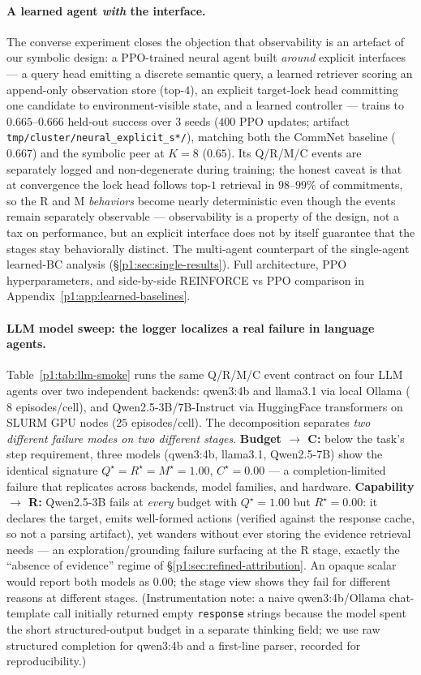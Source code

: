 \documentclass{article}
\begin{document}
\paragraph{A learned agent \emph{with} the interface.} The converse experiment closes the objection that observability is an artefact of our symbolic design: a PPO-trained neural agent built \emph{around} explicit interfaces --- a query head emitting a discrete semantic query, a learned retriever scoring an append-only observation store (top-$4$), an explicit target-lock head committing one candidate to environment-visible state, and a learned controller --- trains to $0.665$--$0.666$ held-out success over $3$ seeds ($400$ PPO updates; artifact \texttt{tmp/cluster/neural\_explicit\_s*/}), matching both the CommNet baseline ($0.667$) and the symbolic peer at $K{=}8$ ($0.65$). Its Q/R/M/C events are separately logged and non-degenerate during training; the honest caveat is that at convergence the lock head follows top-$1$ retrieval in $98$--$99\%$ of commitments, so the R and M \emph{behaviors} become nearly deterministic even though the events remain separately observable --- observability is a property of the design, not a tax on performance, but an explicit interface does not by itself guarantee that the stages stay behaviorally distinct. The multi-agent counterpart of the single-agent learned-BC analysis (\S\ref{p1:sec:single-results}). Full architecture, PPO hyperparameters, and side-by-side REINFORCE vs PPO comparison in Appendix~\ref{p1:app:learned-baselines}.

\paragraph{LLM model sweep: the logger localizes a real failure in language agents.}
Table~\ref{p1:tab:llm-smoke} runs the same Q/R/M/C event contract on four LLM agents over two independent backends: qwen3:4b and llama3.1 via local Ollama ($8$ episodes/cell), and Qwen2.5-3B/7B-Instruct via HuggingFace transformers on SLURM GPU nodes ($25$ episodes/cell). The decomposition separates \emph{two different failure modes on two different stages}. \textbf{Budget $\to$ C:} below the task's step requirement, three models (qwen3:4b, llama3.1, Qwen2.5-7B) show the identical signature $Q^\star{=}R^\star{=}M^\star{=}1.00$, $C^\star{=}0.00$ --- a completion-limited failure that replicates across backends, model families, and hardware. \textbf{Capability $\to$ R:} Qwen2.5-3B fails at \emph{every} budget with $Q^\star{=}1.00$ but $R^\star{=}0.00$: it declares the target, emits well-formed actions (verified against the response cache, so not a parsing artifact), yet wanders without ever storing the evidence retrieval needs --- an exploration/grounding failure surfacing at the R stage, exactly the ``absence of evidence'' regime of \S\ref{p1:sec:refined-attribution}. An opaque scalar would report both models as $0.00$; the stage view shows they fail for different reasons at different stages. (Instrumentation note: a naive qwen3:4b/Ollama chat-template call initially returned empty \texttt{response} strings because the model spent the short structured-output budget in a separate thinking field; we use raw structured completion for qwen3:4b and a first-line parser, recorded for reproducibility.)
\end{document}
